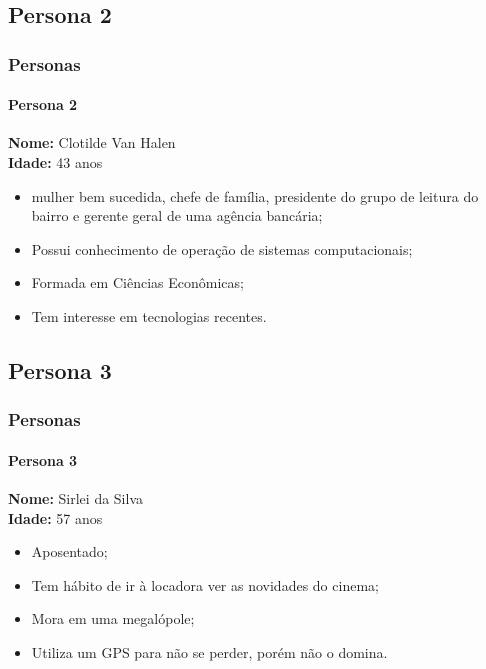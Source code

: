 \documentclass[14pt,beamer]{beamer}
\begin{document}
\subsection{Persona 2}
\begin{frame}
	\frametitle{Personas}
    \framesubtitle{Persona 2}

    \textbf{Nome:} Clotilde Van Halen \\
    \textbf{Idade:} 43 anos \\

    \begin{itemize}
        \item mulher bem sucedida, chefe de família, 
            presidente do grupo de leitura do bairro e gerente geral de uma 
            agência bancária;
        \item Possui conhecimento de operação de sistemas computacionais;
        \item Formada em Ciências Econômicas;
        \item Tem interesse em tecnologias recentes.
    \end{itemize}
\end{frame}
\subsection{Persona 3}

\begin{frame}
	\frametitle{Personas}
    \framesubtitle{Persona 3}

    \textbf{Nome:} Sirlei da Silva \\
    \textbf{Idade:} 57 anos \\

    \begin{itemize}
        \item Aposentado;
        \item Tem hábito de ir à locadora ver as novidades do cinema;
        \item Mora em uma megalópole;
        \item Utiliza um GPS para não se perder, porém não o domina.
    \end{itemize}
\end{frame}

\end{document}
